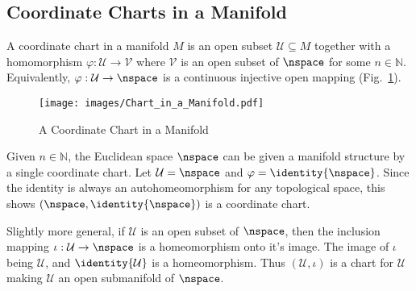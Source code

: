 \documentclass{book}                                                            %
\begin{document}
            \subsection{Coordinate Charts in a Manifold}
                A coordinate chart in a manifold $M$ is an open subset
                $\mathcal{U}\subseteq{M}$ together with a homomorphism
                $\varphi:\mathcal{U}\rightarrow\mathcal{V}$ where $\mathcal{V}$
                is an open subset of $\nspace$ for some $n\in\mathbb{N}$.
                Equivalently, $\varphi:\mathcal{U}\rightarrow\nspace$ is a
                continuous injective open mapping
                (Fig.~\ref{fig:Coordinate_Chart}).
                \begin{figure}[H]
                    \centering
                    \captionsetup{type=figure}
                    \texttt{[image: images/Chart\_in\_a\_Manifold.pdf]}
                    \caption{A Coordinate Chart in a Manifold}
                    \label{fig:Coordinate_Chart}
                \end{figure}
                \begin{example}
                    Given $n\in\mathbb{N}$, the Euclidean space $\nspace$ can be
                    given a manifold structure by a single coordinate chart. Let
                    $\mathcal{U}=\nspace$ and $\varphi=\identity{\nspace}$.
                    Since the identity is always an autohomeomorphism for any
                    topological space, this shows $(\nspace,\identity{\nspace})$
                    is a coordinate chart.
                \end{example}
                \begin{example}
                    Slightly more general, if $\mathcal{U}$ is an open subset of
                    $\nspace$, then the inclusion mapping
                    $\iota:\mathcal{U}\rightarrow\nspace$ is a homeomorphism
                    onto it's image. The image of $\iota$ being $\mathcal{U}$,
                    and $\identity{\mathcal{U}}$ is a homeomorphism. Thus
                    $(\mathcal{U},\iota)$ is a chart for $\mathcal{U}$ making
                    $\mathcal{U}$ an open submanifold of $\nspace$.
                \end{example}
\end{document}
